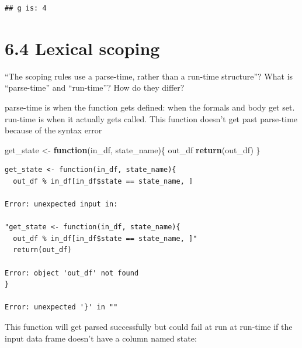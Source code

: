 \documentclass[]{book}
\newenvironment{Shaded}{\begin{snugshade}}{\end{snugshade}}
\newcommand{\ControlFlowTok}[1]{\textcolor[rgb]{0.13,0.29,0.53}{\textbf{#1}}}
\newcommand{\KeywordTok}[1]{\textcolor[rgb]{0.13,0.29,0.53}{\textbf{#1}}}
\newcommand{\NormalTok}[1]{#1}
\newcommand{\OperatorTok}[1]{\textcolor[rgb]{0.81,0.36,0.00}{\textbf{#1}}}
\newcommand{\StringTok}[1]{\textcolor[rgb]{0.31,0.60,0.02}{#1}}
\begin{document}
\begin{verbatim}
## g is: 4
\end{verbatim}

\hypertarget{lexical-scoping}{%
\section*{6.4 Lexical scoping}\label{lexical-scoping}}

``The scoping rules use a parse-time, rather than a run-time structure''? What is ``parse-time'' and ``run-time''? How do they differ?

parse-time is when the function gets defined: when the formals and body get set. run-time is when it actually gets called. This function doesn't get past parse-time because of the syntax error

\begin{Shaded}
\begin{Highlighting}[]
\NormalTok{get_state <-}\StringTok{ }\ControlFlowTok{function}\NormalTok{(in_df, state_name)\{}
\NormalTok{  out_df %
  \KeywordTok{return}\NormalTok{(out_df)}
\NormalTok{\}}
\end{Highlighting}
\end{Shaded}

\begin{verbatim}
get_state <- function(in_df, state_name){
  out_df % in_df[in_df$state == state_name, ]

Error: unexpected input in:

"get_state <- function(in_df, state_name){
  out_df % in_df[in_df$state == state_name, ]"
  return(out_df)

Error: object 'out_df' not found
}

Error: unexpected '}' in "}"
\end{verbatim}

This function will get parsed successfully but could fail at run at run-time if the input data frame doesn't have a column named state:

\begin{Shaded}
\end{Shaded}
\end{document}
